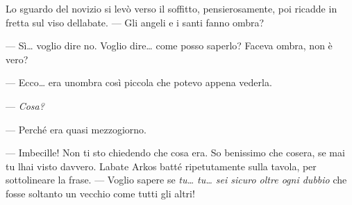 Lo sguardo del novizio si levò verso il soffitto, pensierosamente, poi
ricadde in fretta sul viso dell\textquotesingle abate. --- Gli angeli e
i santi fanno ombra?

--- Sì\ldots{} voglio dire no. Voglio dire\ldots{} come posso saperlo?
Faceva ombra, non è vero?

--- Ecco\ldots{} era un\textquotesingle ombra così piccola che potevo
appena vederla.

--- \emph{Cosa?}

--- Perché era quasi mezzogiorno.

--- Imbecille! Non ti sto chiedendo che cosa era. So benissimo che
cos\textquotesingle era, se mai tu l\textquotesingle hai visto davvero.
L\textquotesingle abate Arkos batté ripetutamente sulla tavola, per
sottolineare la frase. --- Voglio sapere se \emph{tu\ldots{} tu\ldots{}
	sei sicuro oltre ogni dubbio} che fosse soltanto un vecchio come tutti
gli altri!

